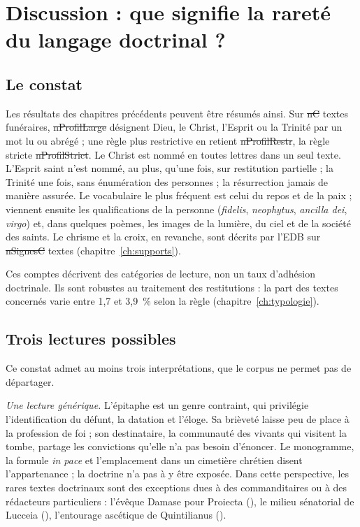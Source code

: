 \chapter{Discussion : que signifie la rareté du langage doctrinal ?}\label{ch:rarete}

\section{Le constat}

Les résultats des chapitres précédents peuvent être résumés ainsi. Sur \st{nC} textes funéraires, \st{nProfilLarge} désignent Dieu, le Christ, l’Esprit ou la Trinité par un mot lu ou abrégé ; une règle plus restrictive en retient \st{nProfilRestr}, la règle stricte \st{nProfilStrict}. Le Christ est nommé en toutes lettres dans un seul texte. L’Esprit saint n’est nommé, au plus, qu’une fois, sur restitution partielle ; la Trinité une fois, sans énumération des personnes ; la résurrection jamais de manière assurée. Le vocabulaire le plus fréquent est celui du repos et de la paix ; viennent ensuite les qualifications de la personne (\emph{fidelis}, \emph{neophytus}, \emph{ancilla dei}, \emph{virgo}) et, dans quelques poèmes, les images de la lumière, du ciel et de la société des saints. Le chrisme et la croix, en revanche, sont décrits par l’EDB sur \st{nSignesC} textes (chapitre~\ref{ch:supports}).

Ces comptes décrivent des catégories de lecture, non un taux d’adhésion doctrinale. Ils sont robustes au traitement des restitutions : la part des textes concernés varie entre 1,7 et 3,9~\% selon la règle (chapitre~\ref{ch:typologie}).

\section{Trois lectures possibles}

Ce constat admet au moins trois interprétations, que le corpus ne permet pas de départager.

\emph{Une lecture générique.} L’épitaphe est un genre contraint, qui privilégie l’identification du défunt, la datation et l’éloge. Sa brièveté laisse peu de place à la profession de foi ; son destinataire, la communauté des vivants qui visitent la tombe, partage les convictions qu’elle n’a pas besoin d’énoncer. Le monogramme, la formule \emph{in pace} et l’emplacement dans un cimetière chrétien disent l’appartenance ; la doctrine n’a pas à y être exposée. Dans cette perspective, les rares textes doctrinaux sont des exceptions dues à des commanditaires ou à des rédacteurs particuliers : l’évêque Damase pour Proiecta (), le milieu sénatorial de Lucceia (), l’entourage ascétique de Quintilianus ().


